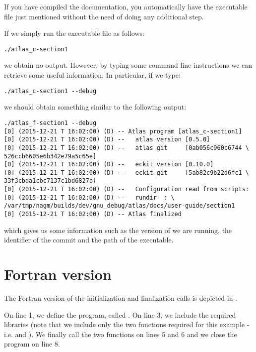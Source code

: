 \begin{notebox}
If you have compiled the documentation, you automatically have 
the executable file just mentioned without the need of doing 
any additional step.
\end{notebox}
%
If we simply run the executable file as follows:
%
\begin{lstlisting}[style=BashStyle]
./atlas_c-section1
\end{lstlisting}
% 
we obtain no output. 
However, by typing some command line instructions we can retrieve 
some useful information. In particular, if we type:
%
\begin{lstlisting}[style=BashStyle]
./atlas_c-section1 --debug
\end{lstlisting}
%
we should obtain something similar to the following output:
%
\begin{lstlisting}[style=BashStyle]
./atlas_f-section1 --debug
[0] (2015-12-21 T 16:02:00) (D) -- Atlas program [atlas_c-section1]
[0] (2015-12-21 T 16:02:00) (D) --   atlas version [0.5.0]
[0] (2015-12-21 T 16:02:00) (D) --   atlas git     [0ab056c960c6744 \
526ccb6605e6b342e79a5c65e]
[0] (2015-12-21 T 16:02:00) (D) --   eckit version [0.10.0]
[0] (2015-12-21 T 16:02:00) (D) --   eckit git     [5ab82c9b22d6fc1 \
33f3cbda1cbc7137c1bd6827b]
[0] (2015-12-21 T 16:02:00) (D) --   Configuration read from scripts:
[0] (2015-12-21 T 16:02:00) (D) --   rundir  : \ 
/var/tmp/nagm/builds/dev/gnu_debug/atlas/docs/user-guide/section1
[0] (2015-12-21 T 16:02:00) (D) -- Atlas finalized
\end{lstlisting}
%
which gives us some information such as the version of \Atlas we are 
running, the identifier of the commit and the path of the executable. 



\section{Fortran version}
\label{s:atlas-section1-F}
The Fortran version of the \Atlas initialization and finalization 
calls is depicted in .
%

%

On line 1, we define the program, called .
On line 3, we include the required \Atlas libraries
(note that we include only the two functions required 
for this example - i.e. \inltf{atlas\_init} and ).
We finally call the two functions  
on lines 5 and 6 and we close the program on line 8.

